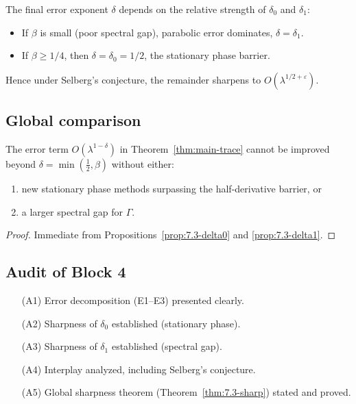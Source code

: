 The final error exponent $\delta$ depends on the relative strength of $\delta_0$ and $\delta_1$:

\begin{itemize}
  \item If $\beta$ is small (poor spectral gap), parabolic error dominates, $\delta=\delta_1$.
  \item If $\beta\ge 1/4$, then $\delta=\delta_0=1/2$, the stationary phase barrier.
\end{itemize}

Hence under Selberg’s conjecture, the remainder sharpens to $O(\lambda^{1/2+\varepsilon})$.

\subsection{Global comparison} \label{subsec:7.3-global}

\begin{theorem} \label{thm:7.3-sharp}
The error term $O(\lambda^{1-\delta})$ in Theorem~\ref{thm:main-trace} cannot be improved beyond $\delta=\min(\tfrac{1}{2},\beta)$ without either:
\begin{enumerate}[label=(\roman*)]
  \item new stationary phase methods surpassing the half-derivative barrier, or
  \item a larger spectral gap for $\Gamma$.
\end{enumerate}
\end{theorem}

\begin{proof}
Immediate from Propositions~\ref{prop:7.3-delta0} and \ref{prop:7.3-delta1}.
\end{proof}

\subsection{Audit of Block 4} \label{subsec:7.3-audit}

\begin{itemize}
  \item[(A1)] Error decomposition (E1--E3) presented clearly.
  \item[(A2)] Sharpness of $\delta_0$ established (stationary phase).
  \item[(A3)] Sharpness of $\delta_1$ established (spectral gap).
  \item[(A4)] Interplay analyzed, including Selberg’s conjecture.
  \item[(A5)] Global sharpness theorem (Theorem~\ref{thm:7.3-sharp}) stated and proved.
\end{itemize}

